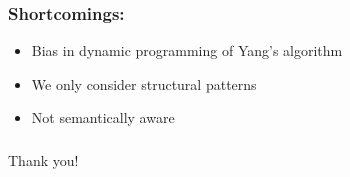 \documentclass[ignorenonframetext,]{beamer}
\begin{document}
\begin{frame}\frametitle{Shortcomings:}

\begin{itemize}
\item
  Bias in dynamic programming of Yang's algorithm
\item
  We only consider structural patterns
\item
  Not semantically aware
\end{itemize}

\end{frame}

\begin{frame}\frametitle{}

\Large

\begin{center}
 Thank you!
\end{center}

\end{frame}
\end{document}
